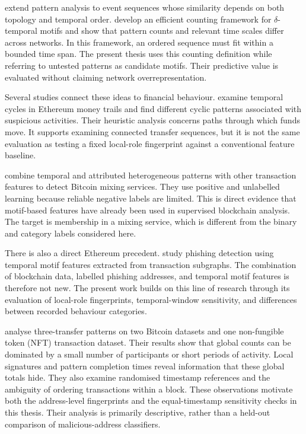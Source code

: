 \citet{kovanen2011temporal} extend pattern analysis to event sequences whose
similarity depends on both topology and temporal order.
\citet{paranjape2017motifs} develop an efficient counting framework for
$\delta$-temporal motifs and show that pattern counts and relevant time scales
differ across networks. In this framework, an ordered sequence must fit within
a bounded time span. The present thesis uses this counting definition while
referring to untested patterns as candidate motifs. Their predictive value is
evaluated without claiming network overrepresentation.

Several studies connect these ideas to financial behaviour.
\citet{lal2021money} examine temporal cycles in Ethereum money trails and find
different cyclic patterns associated with suspicious activities. Their
heuristic analysis concerns paths through which funds move. It supports
examining connected transfer sequences, but it is not the same evaluation as
testing a fixed local-role fingerprint against a conventional feature baseline.

\citet{wu2022mixing} combine temporal and attributed heterogeneous patterns
with other transaction features to detect Bitcoin mixing services. They use
positive and unlabelled learning because reliable negative labels are limited.
This is direct evidence that motif-based features have already been used in
supervised blockchain analysis. The target is membership in a mixing service,
which is different from the binary and category labels considered here.

There is also a direct Ethereum precedent.
\citet{wang2023temporal} study phishing detection using temporal motif
features extracted from transaction subgraphs. The combination of blockchain
data, labelled phishing addresses, and temporal motif features is therefore
not new. The present work builds on this line of research through its
evaluation of local-role fingerprints, temporal-window sensitivity, and
differences between recorded behaviour categories.

\citet{arnold2024motifs} analyse three-transfer patterns on two Bitcoin
datasets and one non-fungible token (NFT) transaction dataset. Their results
show that global counts can be dominated by a small number of participants or
short periods of activity. Local signatures and pattern completion times
reveal information that these global totals hide. They also examine randomised
timestamp references and the ambiguity of ordering transactions within a block.
These observations motivate both the address-level fingerprints and the
equal-timestamp sensitivity checks in this thesis. Their analysis is primarily
descriptive, rather than a held-out comparison of malicious-address classifiers.


